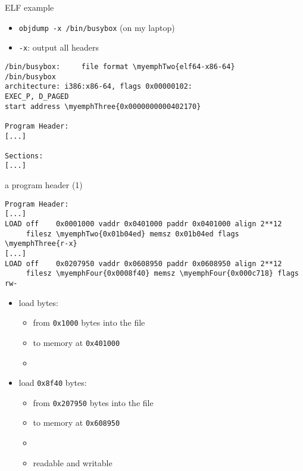 \providecommand{\myemphTwo}[1]{\myemph<2>{#1}}
\providecommand{\myemphTwoB}[1]{\myemph<2>{\textbf<2>{#1}}}
\providecommand{\myemphThree}[1]{\myemph<3>{#1}}
\providecommand{\myemphFour}[1]{\myemph<4>{#1}}
\providecommand{\myemphFive}[1]{\myemph<5>{#1}}
\providecommand{\myemphSix}[1]{\myemph<6>{#1}}
\providecommand{\myemphSeven}[1]{\myemph<7>{#1}}

\begin{frame}[fragile,label=elfExOver1]{ELF example}
    \begin{itemize}
    \item {\tt objdump -x /bin/busybox} (on my laptop)
    \item {\tt -x}: output all headers
    \end{itemize}
\begin{Verbatim}[commandchars=\\\{\},fontsize=\small]
/bin/busybox:     file format \myemphTwo{elf64-x86-64}
/bin/busybox
architecture: i386:x86-64, flags 0x00000102:
EXEC_P, D_PAGED
start address \myemphThree{0x0000000000402170}

Program Header:
[...]

Sections:
[...]
\end{Verbatim}
\end{frame}

\begin{frame}[fragile,label=elfExOver2]{a program header (1)}
\begin{Verbatim}[commandchars=\\\{\},fontsize=\fontsize{9}{10}\selectfont]
Program Header:
[...]
LOAD off    0x0001000 vaddr 0x0401000 paddr 0x0401000 align 2**12
     filesz \myemphTwo{0x01b04ed} memsz 0x01b04ed flags \myemphThree{r-x}
[...]
LOAD off    0x0207950 vaddr 0x0608950 paddr 0x0608950 align 2**12
     filesz \myemphFour{0x0008f40} memsz \myemphFour{0x000c718} flags rw-

\end{Verbatim}
\begin{itemize}
\item load {\tt {}} bytes:
        \begin{itemize}
        \item from {\tt 0x1000} bytes into the file 
        \item to memory at {\tt 0x401000} \\
        \item {}
        \end{itemize}
\item load {\tt 0x8f40} bytes:
        \begin{itemize}
        \item from {\tt 0x207950} bytes into the file 
        \item to memory at {\tt 0x608950} 
        \item {}
        \item readable and writable
        \end{itemize}
\end{itemize}
\end{frame}

